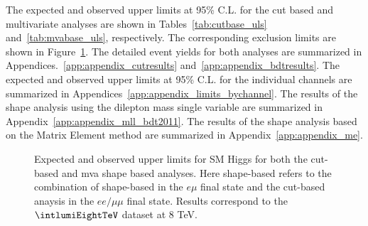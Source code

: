 The expected and observed upper limits at 95\% C.L. for the cut based and
multivariate analyses are shown in Tables~\ref{tab:cutbase_uls}
and~\ref{tab:mvabase_uls}, respectively. The corresponding exclusion
limits are shown in Figure~\ref{fig:uls}. The detailed event yields 
for both analyses are summarized in Appendices.~\ref{app:appendix_cutresults} 
and~\ref{app:appendix_bdtresults}. 
The expected and observed upper limits at 95\% C.L. for the individual channels 
are summarized in Appendices~\ref{app:appendix_limits_bychannel}. 
The results of the shape analysis using the dilepton mass single variable are 
summarized in Appendix~\ref{app:appendix_mll_bdt2011}.
The results of the shape analysis based on the Matrix Element method 
are summarized in Appendix~\ref{app:appendix_me}. 



\begin{figure}[!hbtp]
\centering
{}
\centering
{}
\label{fig:uls}
\caption{\fixme
Expected and observed upper limits for SM Higgs for both the 
cut-based and mva shape based analyses. Here shape-based refers to the combination of 
shape-based in the $e\mu$ final state and the cut-based anaysis in the $ee/\mu\mu$ final state.
Results correspond to the $\intlumiEightTeV$ dataset at 8 TeV. 
}
\end{figure}

